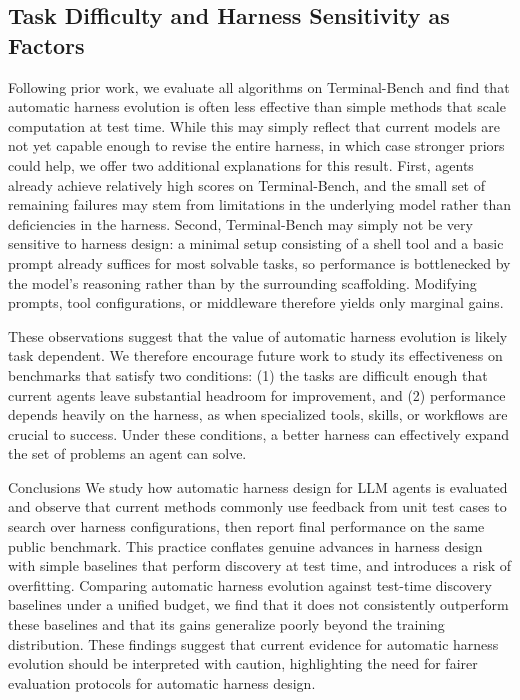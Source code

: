 \documentclass{article}
\begin{document}
\subsection{Task Difficulty and Harness Sensitivity as Factors}
\label{sec:discussion_benchmarks}
Following prior work, we evaluate all algorithms on Terminal-Bench and find that automatic harness evolution is often less effective than simple methods that scale computation at test time. While this may simply reflect that current models are not yet capable enough to revise the entire harness, in which case stronger priors could help, we offer two additional explanations for this result. First, agents already achieve relatively high scores on Terminal-Bench, and the small set of remaining failures may stem from limitations in the underlying model rather than deficiencies in the harness. Second, Terminal-Bench may simply not be very sensitive to harness design: a minimal setup consisting of a shell tool and a basic prompt already suffices for most solvable tasks, so performance is bottlenecked by the model's reasoning rather than by the surrounding scaffolding. Modifying prompts, tool configurations, or middleware therefore yields only marginal gains.

These observations suggest that the value of automatic harness evolution is likely task dependent. We therefore encourage future work to study its effectiveness on benchmarks that satisfy two conditions: (1) the tasks are difficult enough that current agents leave substantial headroom for improvement, and (2) performance depends heavily on the harness, as when specialized tools, skills, or workflows are crucial to success. Under these conditions, a better harness can effectively expand the set of problems an agent can solve.

\begin{section}{Conclusions}\label{sec:conclusion}
We study how automatic harness design for LLM agents is evaluated and observe that current methods commonly use feedback from unit test cases to search over harness configurations, then report final performance on the same public benchmark. This practice conflates genuine advances in harness design with simple baselines that perform discovery at test time, and introduces a risk of overfitting. Comparing automatic harness evolution against test-time discovery baselines under a unified budget, we find that it does not consistently outperform these baselines and that its gains generalize poorly beyond the training distribution. These findings suggest that current evidence for automatic harness evolution should be interpreted with caution, highlighting the need for fairer evaluation protocols for automatic harness design.

\end{section}
\end{document}
